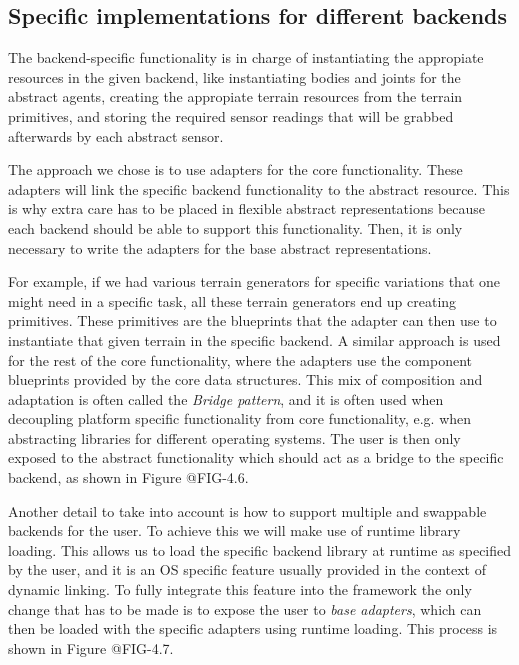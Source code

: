 \subsection{Specific implementations for different backends}


The backend-specific functionality is in charge of instantiating the appropiate 
resources in the given backend, like instantiating bodies and joints for the abstract 
agents, creating the appropiate terrain resources from the terrain primitives, and storing
the required sensor readings that will be grabbed afterwards by each abstract sensor.

The approach we chose is to use adapters for the core functionality. These adapters
will link the specific backend functionality to the abstract resource. This is why
extra care has to be placed in flexible abstract representations because each backend
should be able to support this functionality. Then, it is only necessary to write
the adapters for the base abstract representations.

For example, if we had various terrain generators for specific variations that one
might need in a specific task, all these terrain generators end up creating primitives.
These primitives are the blueprints that the adapter can then use to instantiate that given
terrain in the specific backend. A similar approach is used for the rest of the core
functionality, where the adapters use the component blueprints provided by the core data structures.
This mix of composition and adaptation is often called the \textit{Bridge pattern}, and it is
often used when decoupling platform specific functionality from core functionality, e.g. when
abstracting libraries for different operating systems. The user is then only exposed to
the abstract functionality which should act as a bridge to the specific backend, as shown in
Figure @FIG-4.6.



Another detail to take into account is how to support multiple and swappable backends
for the user. To achieve this we will make use of runtime library loading. This allows us
to load the specific backend library at runtime as specified by the user, and it is an OS specific
feature usually provided in the context of dynamic linking. To fully integrate
this feature into the framework the only change that has to be made is to expose the user 
to \textit{base adapters}, which can then be loaded with the specific adapters using runtime loading.
This process is shown in Figure @FIG-4.7.

